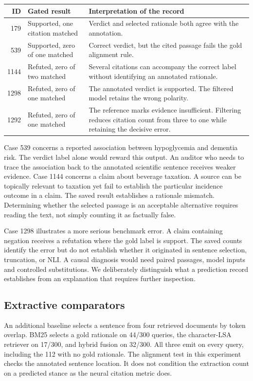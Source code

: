 \begin{center}\small
\begin{tabularx}{\linewidth}{@{}rXX@{}}\toprule
ID & Gated result & Interpretation of the record\\\midrule
179 & Supported, one citation matched & Verdict and selected rationale both agree with the annotation.\\
539 & Supported, zero of one matched & Correct verdict, but the cited passage fails the gold alignment rule.\\
1144 & Refuted, zero of two matched & Several citations can accompany the correct label without identifying an annotated rationale.\\
1298 & Refuted, zero of one matched & The annotated verdict is supported. The filtered model retains the wrong polarity.\\
1292 & Refuted, zero of one matched & The reference marks evidence insufficient. Filtering reduces citation count from three to one while retaining the decisive error.\\\bottomrule
\end{tabularx}
\end{center}
Case 539 concerns a reported association between hypoglycemia and dementia risk. The verdict label alone would reward this output. An auditor who needs to trace the association back to the annotated scientific sentence receives weaker evidence. Case 1144 concerns a claim about beverage taxation. A source can be topically relevant to taxation yet fail to establish the particular incidence outcome in a claim. The saved result establishes a rationale mismatch. Determining whether the selected passage is an acceptable alternative requires reading the text, not simply counting it as factually false.

Case 1298 illustrates a more serious benchmark error. A claim containing negation receives a refutation where the gold label is support. The saved counts identify the error but do not establish whether it originated in sentence selection, truncation, or NLI. A causal diagnosis would need paired passages, model inputs and controlled substitutions. We deliberately distinguish what a prediction record establishes from an explanation that requires further inspection.

\subsection{Extractive comparators}
An additional baseline selects a sentence from four retrieved documents by token overlap. BM25 selects a gold rationale on 44/300 queries, the character-LSA retriever on 17/300, and hybrid fusion on 32/300. All three emit on every query, including the 112 with no gold rationale. The alignment test in this experiment checks the annotated sentence location. It does not condition the extraction count on a predicted stance as the neural citation metric does.

